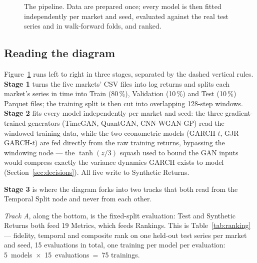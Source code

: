 \documentclass[11pt,a4paper]{article}
\makeatletter
\DeclareRobustCommand{\_}{\ifmmode\nfss@text{\textunderscore}\else\textunderscore\allowbreak\fi}
\makeatother
\begin{document}
\begin{landscape}
\begin{figure}[p]
{
}
\caption{The pipeline. Data are prepared once; every model is then fitted independently per market and seed, evaluated against the real test series and in walk-forward folds, and ranked.}
\label{fig:pipeline}
\end{figure}
\end{landscape}

\subsection{Reading the diagram}
\label{sec:pipeline-reading}
Figure~\ref{fig:pipeline} runs left to right in three stages, separated by the dashed vertical rules. \textbf{Stage 1} turns the five markets' CSV files into log returns and splits each market's series in time into Train (80\,\%), Validation (10\,\%) and Test (10\,\%) Parquet files; the training split is then cut into overlapping 128-step windows. \textbf{Stage 2} fits every model independently per market and seed: the three gradient-trained generators (TimeGAN, QuantGAN, CNN-WGAN-GP) read the windowed training data, while the two econometric models (GARCH-$t$, GJR-GARCH-$t$) are fed directly from the raw training returns, bypassing the windowing node --- the $\tanh(z/3)$ squash used to bound the GAN inputs would compress exactly the variance dynamics GARCH exists to model (Section~\ref{sec:decisions}). All five write to Synthetic Returns.

\textbf{Stage 3} is where the diagram forks into two tracks that both read from the Temporal Split node and never from each other.

\emph{Track A}, along the bottom, is the fixed-split evaluation: Test and Synthetic Returns both feed 19 Metrics, which feeds Rankings. This is Table~\ref{tab:ranking} --- fidelity, temporal and composite rank on one held-out test series per market and seed, 15 evaluations in total, one training per model per evaluation: 5~models~$\times$~15~evaluations~=~75 trainings.
\end{document}
